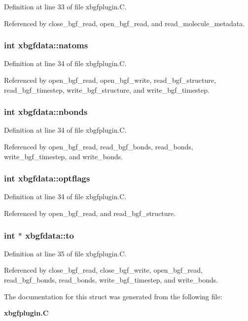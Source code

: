 Definition at line 33 of file xbgfplugin.C.

Referenced by close\_\-bgf\_\-read, open\_\-bgf\_\-read, and read\_\-molecule\_\-metadata.
\subsubsection{\setlength{\rightskip}{0pt plus 5cm}int xbgfdata::natoms}\label{structxbgfdata_m3}




Definition at line 34 of file xbgfplugin.C.

Referenced by open\_\-bgf\_\-read, open\_\-bgf\_\-write, read\_\-bgf\_\-structure, read\_\-bgf\_\-timestep, write\_\-bgf\_\-structure, and write\_\-bgf\_\-timestep.
\subsubsection{\setlength{\rightskip}{0pt plus 5cm}int xbgfdata::nbonds}\label{structxbgfdata_m4}




Definition at line 34 of file xbgfplugin.C.

Referenced by open\_\-bgf\_\-read, read\_\-bgf\_\-bonds, read\_\-bonds, write\_\-bgf\_\-timestep, and write\_\-bonds.
\subsubsection{\setlength{\rightskip}{0pt plus 5cm}int xbgfdata::optflags}\label{structxbgfdata_m5}




Definition at line 34 of file xbgfplugin.C.

Referenced by open\_\-bgf\_\-read, and read\_\-bgf\_\-structure.
\subsubsection{\setlength{\rightskip}{0pt plus 5cm}int $\ast$ xbgfdata::to}\label{structxbgfdata_m8}




Definition at line 35 of file xbgfplugin.C.

Referenced by close\_\-bgf\_\-read, close\_\-bgf\_\-write, open\_\-bgf\_\-read, read\_\-bgf\_\-bonds, read\_\-bonds, write\_\-bgf\_\-timestep, and write\_\-bonds.

The documentation for this struct was generated from the following file:\begin{CompactItemize}
\item 
{\bf xbgfplugin.C}\end{CompactItemize}
